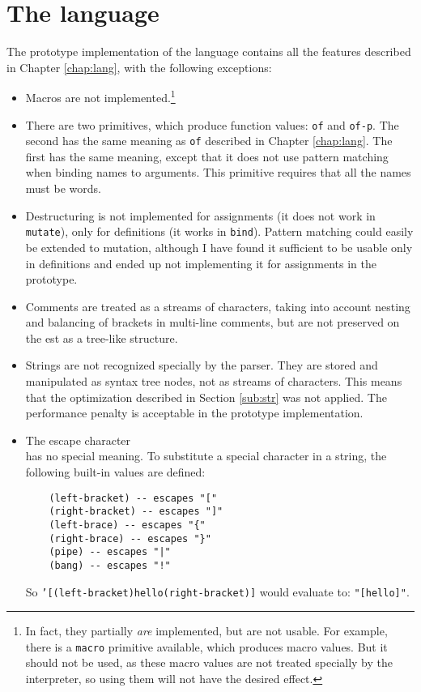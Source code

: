 \section{The language}
The prototype implementation of the language contains all the features described in Chapter \ref{chap:lang}, with the following exceptions:
\begin{itemize}
    \item Macros are not implemented.\footnote{In fact, they partially \textit{are} implemented, but are not usable. For example, there is a \texttt{macro} primitive available, which produces macro values. But it should not be used, as these macro values are not treated specially by the interpreter, so using them will not have the desired effect.}
    \item There are two primitives, which produce function values: \texttt{of} and \texttt{of-p}. The second has the same meaning as \texttt{of} described in Chapter \ref{chap:lang}. The first has the same meaning, except that it does not use pattern matching when binding names to arguments. This primitive requires that all the names must be words.
    \item Destructuring is not implemented for assignments (it does not work in \texttt{mutate}), only for definitions (it works in \texttt{bind}). Pattern matching could easily be extended to mutation, although I have found it sufficient to be usable only in definitions and ended up not implementing it for assignments in the prototype.
    \item Comments are treated as a streams of characters, taking into account nesting and balancing of brackets in multi-line comments, but are not preserved on the \acrshort{est} as a tree-like structure.
    \item Strings are not recognized specially by the parser. They are stored and manipulated as syntax tree nodes, not as streams of characters. This means that the optimization described in Section \ref{sub:str} was not applied. The performance penalty is acceptable in the prototype implementation. 
    \item The escape character \texttt{\\} has no special meaning. To substitute a special character in a string, the following built-in values are defined:
    \begin{lstlisting}
    (left-bracket) -- escapes "["
    (right-bracket) -- escapes "]"
    (left-brace) -- escapes "{"
    (right-brace) -- escapes "}"
    (pipe) -- escapes "|"
    (bang) -- escapes "!"
    \end{lstlisting}
    
    So \texttt{'[(left-bracket)hello(right-bracket)]} would evaluate to: \texttt{"[hello]"}.
\end{itemize}

